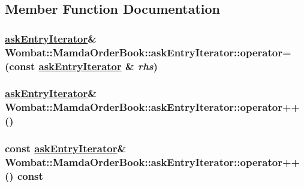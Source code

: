 \subsection{Member Function Documentation}
\hypertarget{classWombat_1_1MamdaOrderBook_1_1askEntryIterator_d3c6aef498ea3a63debd4304344931b2}{
\subsubsection[operator=]{\setlength{\rightskip}{0pt plus 5cm}\hyperlink{classWombat_1_1MamdaOrderBook_1_1askEntryIterator}{ask\-Entry\-Iterator}\& Wombat::Mamda\-Order\-Book::ask\-Entry\-Iterator::operator= (const \hyperlink{classWombat_1_1MamdaOrderBook_1_1askEntryIterator}{ask\-Entry\-Iterator} \& {\em rhs})}}
\label{classWombat_1_1MamdaOrderBook_1_1askEntryIterator_d3c6aef498ea3a63debd4304344931b2}


\hypertarget{classWombat_1_1MamdaOrderBook_1_1askEntryIterator_dd6fe29f2e97eaaf180f47a4f218b359}{
\subsubsection[operator++]{\setlength{\rightskip}{0pt plus 5cm}\hyperlink{classWombat_1_1MamdaOrderBook_1_1askEntryIterator}{ask\-Entry\-Iterator}\& Wombat::Mamda\-Order\-Book::ask\-Entry\-Iterator::operator++ ()}}
\label{classWombat_1_1MamdaOrderBook_1_1askEntryIterator_dd6fe29f2e97eaaf180f47a4f218b359}


\hypertarget{classWombat_1_1MamdaOrderBook_1_1askEntryIterator_3bb3d665738698ff8dc1407e030654cb}{
\subsubsection[operator++]{\setlength{\rightskip}{0pt plus 5cm}const \hyperlink{classWombat_1_1MamdaOrderBook_1_1askEntryIterator}{ask\-Entry\-Iterator}\& Wombat::Mamda\-Order\-Book::ask\-Entry\-Iterator::operator++ () const}}
\label{classWombat_1_1MamdaOrderBook_1_1askEntryIterator_3bb3d665738698ff8dc1407e030654cb}


